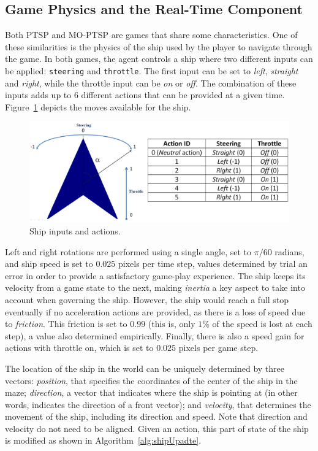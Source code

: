 \documentclass[conference]{IEEEtran}
\begin{document}
\subsection{Game Physics and the Real-Time Component}

Both PTSP and MO-PTSP are games that share some characteristics. One of these similarities is the physics of the ship used by the player to navigate through the game. In both games, the agent controls a ship where two different inputs can be applied: \texttt{steering} and \texttt{throttle}. The first input can be set to \textit{left}, \textit{straight} and \textit{right}, while the throttle input can be \textit{on} or \textit{off}. The combination of these inputs adds up to $6$ different actions that can be provided at a given time. Figure~\ref{fig:ship} depicts the moves available for the ship.

\begin{figure} [!h]
	\begin{center}
	\includegraphics[scale=0.14]{img/ShipActions}
	\caption{Ship inputs and actions.}
	\label{fig:ship}
	\end{center}
\end{figure}

Left and right rotations are performed using a single angle, set to $\pi/60$ radians, and ship speed is set to $0.025$ pixels per time step, values determined by trial an error in order to provide a satisfactory game-play experience. The ship keeps its velocity from a game state to the next, making \textit{inertia} a key aspect to take into account when governing the ship. However, the ship would reach a full stop eventually if no acceleration actions are provided, as there is a loss of speed due to \textit{friction}. This friction is  set to $0.99$ (this is, only $1\%$ of the speed is lost at each step), a value also determined empirically. Finally, there is also a speed gain for actions with throttle on, which is set to $0.025$ pixels per game step. 

The location of the ship in the world can be uniquely determined by three vectors: \textit{position}, that specifies the coordinates of the center of the ship in the maze; \textit{direction}, a vector that indicates where the ship is pointing at (in other words, indicates the direction of a front vector); and \textit{velocity}, that determines the movement of the ship, including its direction and speed. Note that direction and velocity do not need to be aligned. Given an action, this part of state of the ship is modified as shown in Algorithm~\ref{alg:shipUpadte}.
\end{document}
